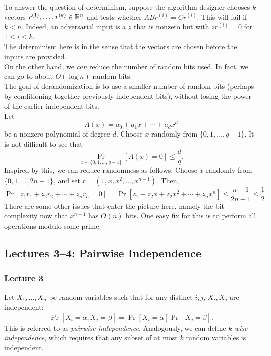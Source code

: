 		To answer the question of determinism, suppose the algorithm designer chooses $k$ vectors $r^{(1)},\ldots,r^{(k)} \in \mathbb{R}^n$ and tests whether $ABr^{(i)} = Cr^{(i)}$. This will fail if $k < n$. Indeed, an adversarial input is a $z$ that is nonzero but with $zr^{(i)} = 0$ for $1 \le i \le k$.\\
		The determinism here is in the sense that the vectors are chosen before the inputs are provided.\\

		On the other hand, we \emph{can} reduce the number of random bits used. In fact, we can go to about $O(\log n)$ random bits.\\
		The goal of derandomization is to use a smaller number of random bits (perhaps by conditioning together previously independent bits), without losing the power of the earlier independent bits.\\
		Let
		\[ A(x) = a_0 + a_1x + \cdots + a_{d}x^{d} \]
		be a nonzero polynomial of degree $d$. Choose $x$ randomly from $\{0,1,\ldots,q-1\}$. It is not difficult to see that
		\[ \Pr_{x \sim \{0,1,\ldots,q-1\}}\left[ A(x) = 0 \right] \le \frac{d}{q}. \]
		Inspired by this, we can reduce randomness as follows. Choose $x$ randomly from $\{0,1,\ldots,2n-1\}$, and set $r = (1,x,x^2,\ldots,x^{n-1})$. Then,
		\[ \Pr[ z_1r_1 + z_2r_2 + \cdots + z_nr_n = 0 ] = \Pr\left[ z_1 + z_2x + z_2x^2 + \cdots + z_nx^n \right] \le \frac{n-1}{2n-1} \le \frac{1}{2}. \]
		There are some other issues that enter the picture here, namely the bit complexity now that $x^{n-1}$ has $O(n)$ bits. One easy fix for this is to perform all operations modulo some prime.



	\subsection{Lectures 3--4: Pairwise Independence}

		\subsubsection{Lecture 3}

			Let $X_1,\ldots,X_n$ be random variables such that for any distinct $i,j$, $X_i,X_j$ are independent:
			\[ \Pr[X_i = \alpha, X_j = \beta] = \Pr[X_i = \alpha] \Pr[X_j = \beta]. \]
			This is referred to as \emph{pairwise independence}. Analogously, we can define \emph{$k$-wise independence}, which requires that any subset of at most $k$ random variables is independent.

